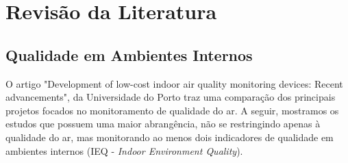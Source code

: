 \documentclass[../monografia.tex]{subfiles}
\begin{document}
\section{Revisão da Literatura} 

\subsection{Qualidade em Ambientes Internos}

O artigo "Development of low-cost indoor air quality monitoring devices:
Recent advancements", da Universidade do Porto \cite{IAQ_Compare} traz uma comparação dos principais projetos focados no monitoramento de qualidade do ar. A seguir, mostramos os estudos que possuem uma maior abrangência, não se restringindo apenas à qualidade do ar, mas monitorando ao menos dois indicadores de qualidade em ambientes internos (IEQ - \textit{Indoor Environment Quality}). 

\end{document}
